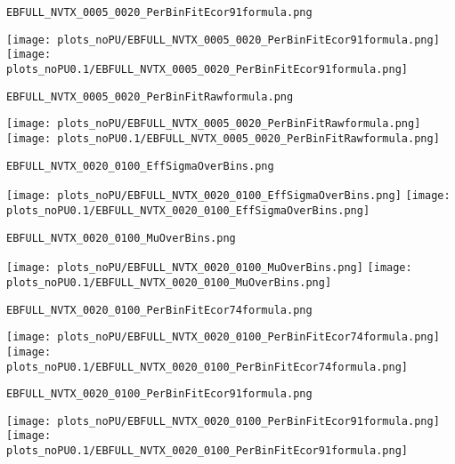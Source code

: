 \begin{frame}[fragile]
\begin{verbatim}
EBFULL_NVTX_0005_0020_PerBinFitEcor91formula.png
\end{verbatim}
\texttt{[image: plots\_noPU/EBFULL\_NVTX\_0005\_0020\_PerBinFitEcor91formula.png]}
\texttt{[image: plots\_noPU0.1/EBFULL\_NVTX\_0005\_0020\_PerBinFitEcor91formula.png]}
\end{frame}
\begin{frame}[fragile]
\begin{verbatim}
EBFULL_NVTX_0005_0020_PerBinFitRawformula.png
\end{verbatim}
\texttt{[image: plots\_noPU/EBFULL\_NVTX\_0005\_0020\_PerBinFitRawformula.png]}
\texttt{[image: plots\_noPU0.1/EBFULL\_NVTX\_0005\_0020\_PerBinFitRawformula.png]}
\end{frame}
\begin{frame}[fragile]
\begin{verbatim}
EBFULL_NVTX_0020_0100_EffSigmaOverBins.png
\end{verbatim}
\texttt{[image: plots\_noPU/EBFULL\_NVTX\_0020\_0100\_EffSigmaOverBins.png]}
\texttt{[image: plots\_noPU0.1/EBFULL\_NVTX\_0020\_0100\_EffSigmaOverBins.png]}
\end{frame}
\begin{frame}[fragile]
\begin{verbatim}
EBFULL_NVTX_0020_0100_MuOverBins.png
\end{verbatim}
\texttt{[image: plots\_noPU/EBFULL\_NVTX\_0020\_0100\_MuOverBins.png]}
\texttt{[image: plots\_noPU0.1/EBFULL\_NVTX\_0020\_0100\_MuOverBins.png]}
\end{frame}
\begin{frame}[fragile]
\begin{verbatim}
EBFULL_NVTX_0020_0100_PerBinFitEcor74formula.png
\end{verbatim}
\texttt{[image: plots\_noPU/EBFULL\_NVTX\_0020\_0100\_PerBinFitEcor74formula.png]}
\texttt{[image: plots\_noPU0.1/EBFULL\_NVTX\_0020\_0100\_PerBinFitEcor74formula.png]}
\end{frame}
\begin{frame}[fragile]
\begin{verbatim}
EBFULL_NVTX_0020_0100_PerBinFitEcor91formula.png
\end{verbatim}
\texttt{[image: plots\_noPU/EBFULL\_NVTX\_0020\_0100\_PerBinFitEcor91formula.png]}
\texttt{[image: plots\_noPU0.1/EBFULL\_NVTX\_0020\_0100\_PerBinFitEcor91formula.png]}
\end{frame}
